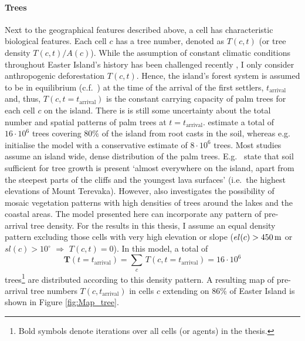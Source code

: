 \paragraph{Trees}
Next to the geographical features described above, a cell has characteristic biological features.%
Each cell $c$ has a tree number, denoted as $T(c,t)$ (or tree density $T(c,t)/A(c)$).
While the assumption of constant climatic conditions throughout Easter Island's history has been challenged recently \citep{Rull2020}, I only consider anthropogenic deforestation $T(c,t)$.
Hence, the island's forest system is assumed to be in equilibrium (c.f.\ \citet{Brander1998}) at the time of the arrival of the first settlers, $t_\text{arrival}$ and, thus, $T(c,t=t_\text{arrival})$ is the constant carrying capacity of palm trees for each cell $c$ on the island. 
There is is still some uncertainty about the total number and spatial patterns of palm trees at $t=t_\text{arrival}$.
\citet{Mieth2015} estimate a total of $16\cdot 10^6$ trees covering $80\%$ of the island from root casts in the soil, whereas e.g.\ \citet{Brandt2015} initialise the model with a conservative estimate of $8\cdot 10^6$ trees. 
Most studies assume an island wide, dense distribution of the palm trees. 
E.g.\ \citet{Bahn2017} state that soil sufficient for tree growth is present `almost everywhere on the island, apart from the steepest parts of the cliffs and the youngest lava surfaces' (i.e.\ the highest elevations of Mount Terevaka). 
However, \citet{Rull2020} also investigates the possibility of mosaic vegetation patterns with high densities of trees around the lakes and the coastal areas.
The model presented here can incorporate any pattern of pre-arrival tree density. 
For the results in this thesis, I assume an equal density pattern excluding those cells with very high elevation or slope ($el(c)>450\, {\rm m}$ or $sl(c)>10^\circ$ $\Rightarrow$ $T(c,t) = 0$).
In this model, a total of 
\begin{equation}
\mathbf{T}(t=t_\text{arrival}) = \sum_{c} \, T(c,t=t_\text{arrival}) =  16 \cdot 10^6
\end{equation} 
trees\footnote{Bold symbols denote iterations over all cells (or agents) in the thesis.} are distributed according to this density pattern.
A resulting map of pre-arrival tree numbers $T(c,t_\text{arrival})$ in cells $c$ extending on $86\%$ of Easter Island is shown in Figure \ref{fig:Map_tree}.


